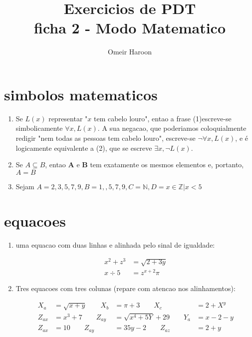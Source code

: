 \documentclass[12pt,a4paper]{article}
\author{Omeir Haroon}
\title{Exercicios de PDT \\ ficha 2 -  Modo Matematico}
\begin{document}
\maketitle
\section{simbolos matematicos}
\begin{enumerate}[label = \Alph*.]
\item Se $L(x)$ representar "$x$ tem cabelo louro", entao a frase (1)escreve-se simbolicamente $\forall x, L(x)$. A sua negacao, que poderiamos coloquialmente redigir "nem todas as pessoas tem cabelo louro", escreve-se $\neg \forall x,L(x)$, e é logicamente equivalente a (2), que se escreve $\exists x,\neg L(x)$.

\item Se \textbf{$A \subseteq B$}, entao \textbf{A} e \textbf{B} tem exatamente os mesmos elementos e, portanto, \textbf{$A = B$}

\item Sejam \textbf{$A = 2,3,5,7,9, B = 1,,5,7,9, C = \mathbb{N}, D = {{x \in \mathbb{Z}|x<5 }} $}

\end{enumerate}
\section{equacoes}
\begin{enumerate}[label=\roman*]
\item uma equacao com duas linhas e alinhada pelo sinal de igualdade:

\begin{equation}
\begin{split}
x^2 + z^3 &= \sqrt{2+3y} \\
x \div 5 &= z^{x+2} \pi
\end{split}
\end{equation}

\item Tres equacoes com tres colunas (repare com atencao nos alinhamentos): 


\begin{align}
X_a &= \sqrt{x+y} \qquad X_b &= \pi +3 \qquad X_c &= 2 + X^y \\ 
Z_{ax} &= x^3 + 7 \qquad Z_{ay} &= \sqrt{x^4 + 5Y} + 29 \qquad Y_a &= x-2-y \\
Z_{ax} &= 10 \qquad Z_{ay} &= 35y - 2 \qquad Z_{az} &= 2+y
\end{align}

\end{enumerate}
\end{document}
